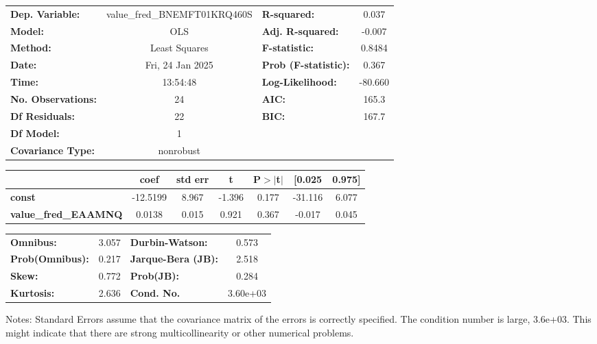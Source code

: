 \begin{center}
\begin{tabular}{lclc}
\toprule
\textbf{Dep. Variable:}      & value\_fred\_BNEMFT01KRQ460S & \textbf{  R-squared:         } &     0.037   \\
\textbf{Model:}              &             OLS              & \textbf{  Adj. R-squared:    } &    -0.007   \\
\textbf{Method:}             &        Least Squares         & \textbf{  F-statistic:       } &    0.8484   \\
\textbf{Date:}               &       Fri, 24 Jan 2025       & \textbf{  Prob (F-statistic):} &    0.367    \\
\textbf{Time:}               &           13:54:48           & \textbf{  Log-Likelihood:    } &   -80.660   \\
\textbf{No. Observations:}   &                24            & \textbf{  AIC:               } &     165.3   \\
\textbf{Df Residuals:}       &                22            & \textbf{  BIC:               } &     167.7   \\
\textbf{Df Model:}           &                 1            & \textbf{                     } &             \\
\textbf{Covariance Type:}    &          nonrobust           & \textbf{                     } &             \\
\bottomrule
\end{tabular}
\begin{tabular}{lcccccc}
                             & \textbf{coef} & \textbf{std err} & \textbf{t} & \textbf{P$> |$t$|$} & \textbf{[0.025} & \textbf{0.975]}  \\
\midrule
\textbf{const}               &     -12.5199  &        8.967     &    -1.396  &         0.177        &      -31.116    &        6.077     \\
\textbf{value\_fred\_EAAMNQ} &       0.0138  &        0.015     &     0.921  &         0.367        &       -0.017    &        0.045     \\
\bottomrule
\end{tabular}
\begin{tabular}{lclc}
\textbf{Omnibus:}       &  3.057 & \textbf{  Durbin-Watson:     } &    0.573  \\
\textbf{Prob(Omnibus):} &  0.217 & \textbf{  Jarque-Bera (JB):  } &    2.518  \\
\textbf{Skew:}          &  0.772 & \textbf{  Prob(JB):          } &    0.284  \\
\textbf{Kurtosis:}      &  2.636 & \textbf{  Cond. No.          } & 3.60e+03  \\
\bottomrule
\end{tabular}
\end{center}

Notes: \newline
 [1] Standard Errors assume that the covariance matrix of the errors is correctly specified. \newline
 [2] The condition number is large, 3.6e+03. This might indicate that there are \newline
 strong multicollinearity or other numerical problems.